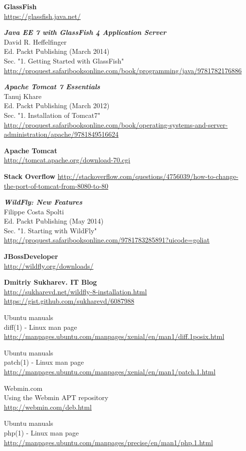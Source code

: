 \begin{thebibliography}{10}
\textbf{GlassFish}\\
  \url{https://glassfish.java.net/}

\textbf{\textit{Java EE 7 with GlassFish 4 Application Server}}\\
David R. Heffelfinger\\
Ed. Packt Publishing (March 2014)\\
Sec. "1. Getting Started with GlassFish"\\
  \url{http://proquest.safaribooksonline.com/book/programming/java/9781782176886}

\textbf{\textit{Apache Tomcat 7 Essentials}}\\
Tanuj Khare\\
Ed. Packt Publishing (March 2012)\\
Sec. "1. Installation of Tomcat7"\\
  \url{http://proquest.safaribooksonline.com/book/operating-systems-and-server-administration/apache/9781849516624}

\textbf{Apache Tomcat}\\
  \url{http://tomcat.apache.org/download-70.cgi}

\textbf{Stack Overflow}
  \url{http://stackoverflow.com/questions/4756039/how-to-change-the-port-of-tomcat-from-8080-to-80}

\textbf{\textit{WildFly: New Features}}\\
Filippe Costa Spolti\\
Ed. Packt Publishing (May 2014)\\
Sec. "1. Starting with WildFly"\\
  \url{http://proquest.safaribooksonline.com/9781783285891?uicode=goliat} 

\textbf{JBossDeveloper}\\
  \url{http://wildfly.org/downloads/}

\textbf{Dmitriy Sukharev. IT Blog}\\
  \url{http://sukharevd.net/wildfly-8-installation.html}
  \url{https://gist.github.com/sukharevd/6087988}

Ubuntu manuals\\
diff(1) - Linux man page\\
  \url{http://manpages.ubuntu.com/manpages/xenial/en/man1/diff.1posix.html}

Ubuntu manuals\\
patch(1) - Linux man page\\
  \url{http://manpages.ubuntu.com/manpages/xenial/en/man1/patch.1.html}

Webmin.com\\
Using the Webmin APT repository\\
  \url{http://webmin.com/deb.html}

Ubuntu manuals\\
php(1) - Linux man page\\
  \url{http://manpages.ubuntu.com/manpages/precise/en/man1/php.1.html}

\end{thebibliography}
